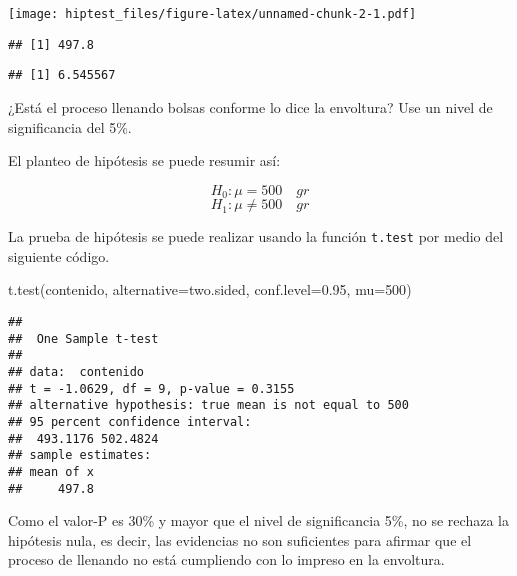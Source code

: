 \documentclass[
]{article}
\newenvironment{Shaded}{}{}
\newcommand{\AttributeTok}[1]{\textcolor[rgb]{0.49,0.56,0.16}{#1}}
\newcommand{\DecValTok}[1]{\textcolor[rgb]{0.25,0.63,0.44}{#1}}
\newcommand{\FloatTok}[1]{\textcolor[rgb]{0.25,0.63,0.44}{#1}}
\newcommand{\FunctionTok}[1]{\textcolor[rgb]{0.02,0.16,0.49}{#1}}
\newcommand{\NormalTok}[1]{#1}
\newcommand{\SpecialCharTok}[1]{\textcolor[rgb]{0.25,0.44,0.63}{#1}}
\newcommand{\StringTok}[1]{\textcolor[rgb]{0.25,0.44,0.63}{#1}}
\begin{document}
\texttt{[image: hiptest\_files/figure-latex/unnamed-chunk-2-1.pdf]}

\begin{Shaded}
\end{Shaded}

\begin{verbatim}
## [1] 497.8
\end{verbatim}

\begin{Shaded}
\end{Shaded}

\begin{verbatim}
## [1] 6.545567
\end{verbatim}

¿Está el proceso llenando bolsas conforme lo dice la envoltura? Use un
nivel de significancia del 5\%.

El planteo de hipótesis se puede resumir así:

\[H_0: \mu = 500 \quad gr\] \[H_1: \mu \neq 500 \quad gr\]

La prueba de hipótesis se puede realizar usando la función
\texttt{t.test} por medio del siguiente código.

\begin{Shaded}
\begin{Highlighting}[]
\FunctionTok{t.test}\NormalTok{(contenido, }\AttributeTok{alternative=}\StringTok{\textquotesingle{}two.sided\textquotesingle{}}\NormalTok{,}
       \AttributeTok{conf.level=}\FloatTok{0.95}\NormalTok{, }\AttributeTok{mu=}\DecValTok{500}\NormalTok{)}
\end{Highlighting}
\end{Shaded}

\begin{verbatim}
## 
##  One Sample t-test
## 
## data:  contenido
## t = -1.0629, df = 9, p-value = 0.3155
## alternative hypothesis: true mean is not equal to 500
## 95 percent confidence interval:
##  493.1176 502.4824
## sample estimates:
## mean of x 
##     497.8
\end{verbatim}

Como el valor-P es 30\% y mayor que el nivel de significancia 5\%, no se
rechaza la hipótesis nula, es decir, las evidencias no son suficientes
para afirmar que el proceso de llenando no está cumpliendo con lo
impreso en la envoltura.
\end{document}
